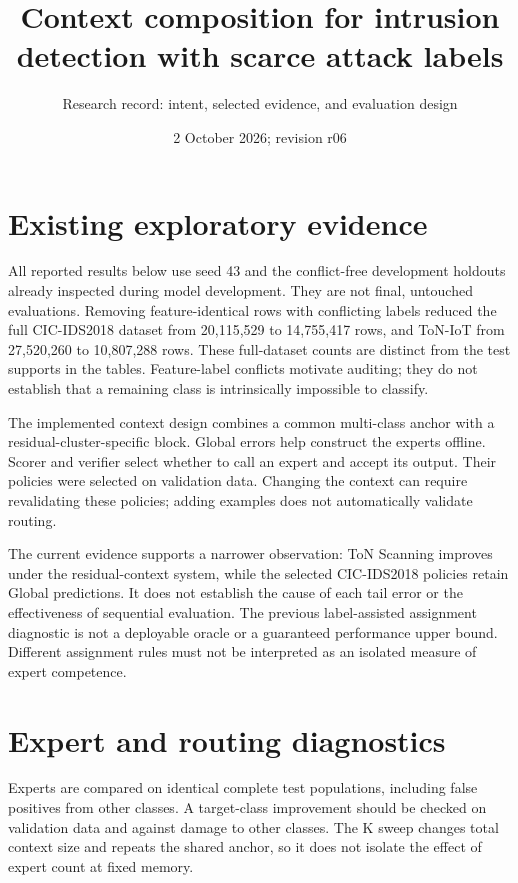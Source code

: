 \documentclass[11pt]{article}
\title{Context composition for intrusion detection with scarce attack labels}
\author{Research record: intent, selected evidence, and evaluation design}
\date{2 October 2026; revision r06}
\begin{document}
\maketitle


\section{Existing exploratory evidence}
All reported results below use seed 43 and the conflict-free development holdouts already inspected during model development. They are not final, untouched evaluations. Removing feature-identical rows with conflicting labels reduced the full CIC-IDS2018 dataset from 20,115,529 to 14,755,417 rows, and ToN-IoT from 27,520,260 to 10,807,288 rows. These full-dataset counts are distinct from the test supports in the tables. Feature-label conflicts motivate auditing; they do not establish that a remaining class is intrinsically impossible to classify.

The implemented context design combines a common multi-class anchor with a residual-cluster-specific block. Global errors help construct the experts offline. Scorer and verifier select whether to call an expert and accept its output. Their policies were selected on validation data. Changing the context can require revalidating these policies; adding examples does not automatically validate routing.

The current evidence supports a narrower observation: ToN Scanning improves under the residual-context system, while the selected CIC-IDS2018 policies retain Global predictions. It does not establish the cause of each tail error or the effectiveness of sequential evaluation. The previous label-assisted assignment diagnostic is not a deployable oracle or a guaranteed performance upper bound. Different assignment rules must not be interpreted as an isolated measure of expert competence.




\clearpage
\section{Expert and routing diagnostics}
Experts are compared on identical complete test populations, including false positives from other classes. A target-class improvement should be checked on validation data and against damage to other classes. The K sweep changes total context size and repeats the shared anchor, so it does not isolate the effect of expert count at fixed memory.



\clearpage

\end{document}
